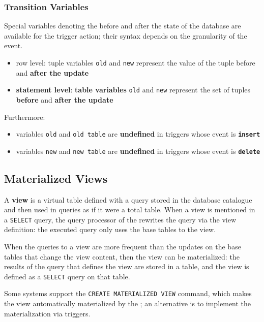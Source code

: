 \documentclass[english]{article}
\begin{document}
\subsubsection{Transition Variables}

Special variables denoting the before and after the state of the database are available for the trigger action;
their syntax depends on the granularity of the event.

\begin{itemize}
  \item row level: tuple variables \texttt{old} and \texttt{new} represent the value of the tuple before and \textbf{after the update}
  \item \textbf{statement level}: \textbf{table variables} \texttt{old} and \texttt{new} represent the set of tuples \textbf{before} and \textbf{after the update}
\end{itemize}

Furthermore:

\begin{itemize}
  \item variables \texttt{old} and \texttt{old table} are \textbf{undefined} in triggers whose event is \textbf{\texttt{insert}}
  \item variables \texttt{new} and \texttt{new table} are \textbf{undefined} in triggers whose event is \textbf{\texttt{delete}}
\end{itemize}

\subsection{Materialized Views}

A \textbf{view} is a virtual table defined with a query stored in the database catalogue and then used in queries as if it were a total table.
When a view is mentioned in a \texttt{SELECT} query, the query processor of the \dbms rewrites the query via the view definition:
the executed query only uses the base tables to the view.

When the queries to a view are more frequent than the updates on the base tables that change the view content, then the view can be materialized:
the results of the query that defines the view are stored in a table, and the view is defined as a \texttt{SELECT} query on that table.

Some systems support the \texttt{CREATE MATERIALIZED VIEW} command, which makes the view automatically materialized by the \dbms;
an alternative is to implement the materialization via triggers.
\end{document}
